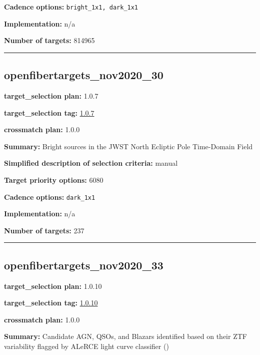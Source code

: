 \noindent\textbf{Cadence options:} \texttt{bright\_1x1,\ dark\_1x1}

\noindent\textbf{Implementation:} n/a

\noindent\textbf{Number of targets:} 814965

\begin{center}\rule{0.5\linewidth}{0.5pt}\end{center}

\hypertarget{openfibertargets_nov2020_30_plan1.0.7}{%
\subsection{openfibertargets\_nov2020\_30}\label{openfibertargets_nov2020_30_plan1.0.7}}

\noindent\textbf{target\_selection plan:} 1.0.7

\noindent\textbf{target\_selection tag:}
\href{https://github.com/sdss/target_selection/tree/1.0.7/}{1.0.7}

\noindent\textbf{crossmatch plan:} 1.0.0

\noindent\textbf{Summary:} Bright sources in the JWST North Ecliptic Pole
Time-Domain Field

\noindent\textbf{Simplified description of selection criteria:} manual


\noindent\textbf{Target priority options:} 6080

\noindent\textbf{Cadence options:} \texttt{dark\_1x1}

\noindent\textbf{Implementation:} n/a

\noindent\textbf{Number of targets:} 237

\begin{center}\rule{0.5\linewidth}{0.5pt}\end{center}

\hypertarget{openfibertargets_nov2020_33_plan1.0.10}{%
\subsection{openfibertargets\_nov2020\_33}\label{openfibertargets_nov2020_33_plan1.0.10}}

\noindent\textbf{target\_selection plan:} 1.0.10

\noindent\textbf{target\_selection tag:}
\href{https://github.com/sdss/target_selection/tree/1.0.10/}{1.0.10}

\noindent\textbf{crossmatch plan:} 1.0.0

\noindent\textbf{Summary:} Candidate AGN, QSOs, and Blazars identified based on
their ZTF variability flagged by ALeRCE light curve classifier
(\citealt{SanchezSaez2020})

